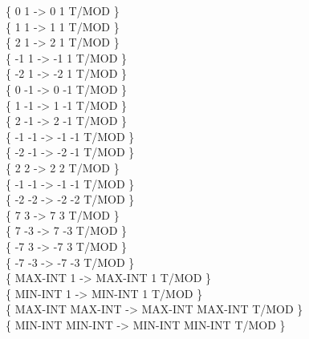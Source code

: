 \begin{tt}
\{       0       1  ->       0       1 T/MOD \} \\
\{       1       1  ->       1       1 T/MOD \} \\
\{       2       1  ->       2       1 T/MOD \} \\
\{      -1       1  ->      -1       1 T/MOD \} \\
\{      -2       1  ->      -2       1 T/MOD \} \\
\{       0      -1  ->       0      -1 T/MOD \} \\
\{       1      -1  ->       1      -1 T/MOD \} \\
\{       2      -1  ->       2      -1 T/MOD \} \\
\{      -1      -1  ->      -1      -1 T/MOD \} \\
\{      -2      -1  ->      -2      -1 T/MOD \} \\
\{       2       2  ->       2       2 T/MOD \} \\
\{      -1      -1  ->      -1      -1 T/MOD \} \\
\{      -2      -2  ->      -2      -2 T/MOD \} \\
\{       7       3  ->       7       3 T/MOD \} \\
\{       7      -3  ->       7      -3 T/MOD \} \\
\{      -7       3  ->      -7       3 T/MOD \} \\
\{      -7      -3  ->      -7      -3 T/MOD \} \\
\{ MAX-INT       1  -> MAX-INT       1 T/MOD \} \\
\{ MIN-INT       1  -> MIN-INT       1 T/MOD \} \\
\{ MAX-INT MAX-INT  -> MAX-INT MAX-INT T/MOD \} \\
\{ MIN-INT MIN-INT  -> MIN-INT MIN-INT T/MOD \}


\end{tt}
